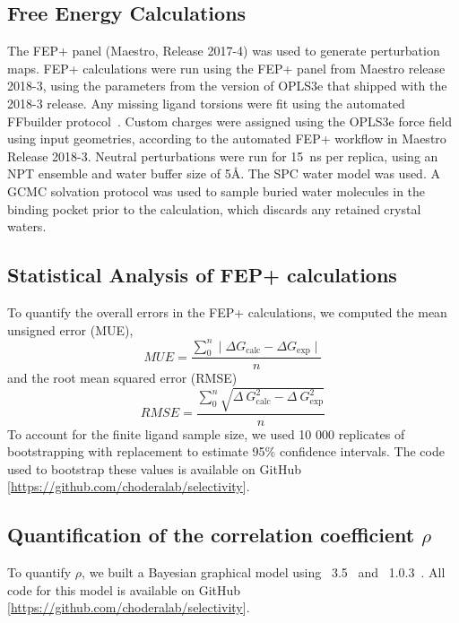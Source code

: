 \documentclass[phd,tocprelim]{cornell}
\begin{document}
\subsection{Free Energy Calculations}

The FEP+ panel (Maestro, Release 2017-4) was used to generate perturbation maps. FEP+ calculations were run using the FEP+ panel from Maestro release 2018-3, using the parameters from the version of OPLS3e that shipped with the 2018-3 release. Any missing ligand torsions were fit using the automated FFbuilder protocol~\citep{Abel:Acc.Chem.Res.:2017}. 
Custom charges were assigned using the OPLS3e force field using input geometries, according to the automated FEP+ workflow in Maestro Release 2018-3. Neutral perturbations were run for 15~ns per replica, using an NPT ensemble and water buffer size of 5\AA. 
The SPC water model was used. 
A GCMC solvation protocol was used to sample buried water molecules in the binding pocket prior to the calculation, which discards any retained crystal waters. 

\subsection{Statistical Analysis of FEP+ calculations}
To quantify the overall errors in the FEP+ calculations, we computed the mean unsigned error (MUE),
\begin{equation}\label{eq:sample-mue}
MUE = \frac{ \sum_{0}^{n} \mid \Delta G _\text{calc} - \Delta G _\text{exp} \mid}{n}
\end{equation}
and the root mean squared error (RMSE)
\begin{equation}\label{eq:sample-rmse}
RMSE = \frac{ \sum_{0}^{n} \sqrt{\Delta~G_\text{calc}^2 - \Delta~G_\text{exp}^2}}{n} 
\end{equation}
To account for the finite ligand sample size, we used 10 000 replicates of bootstrapping with replacement to estimate  95\% confidence intervals.
The code used to bootstrap these values is available on GitHub [\url{https://github.com/choderalab/selectivity}].


\subsection{Quantification of the correlation coefficient $\rho$}
To quantify $\rho$, we built a Bayesian graphical model using ~3.5~\citep{Salvatier:2016ki} and ~1.0.3~\citep{2016arXiv160502688full}.
All code for this model is available on GitHub [\url{https://github.com/choderalab/selectivity}].
\end{document}
